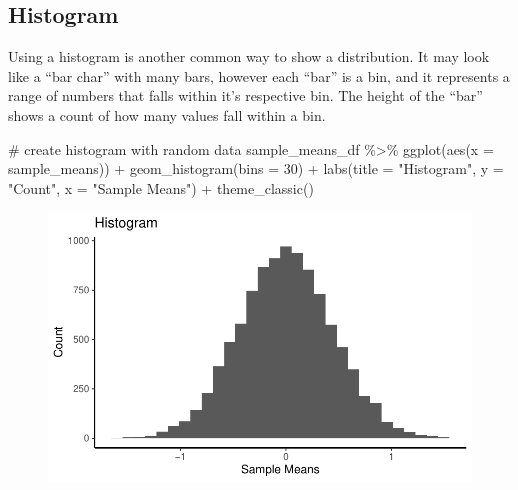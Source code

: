 \documentclass[
  letterpaper,
  DIV=11,
  numbers=noendperiod]{scrreprt}
\newenvironment{Shaded}{\begin{snugshade}}{\end{snugshade}}
\newcommand{\AttributeTok}[1]{\textcolor[rgb]{0.40,0.45,0.13}{#1}}
\newcommand{\CommentTok}[1]{\textcolor[rgb]{0.37,0.37,0.37}{#1}}
\newcommand{\DecValTok}[1]{\textcolor[rgb]{0.68,0.00,0.00}{#1}}
\newcommand{\FunctionTok}[1]{\textcolor[rgb]{0.28,0.35,0.67}{#1}}
\newcommand{\NormalTok}[1]{\textcolor[rgb]{0.00,0.23,0.31}{#1}}
\newcommand{\SpecialCharTok}[1]{\textcolor[rgb]{0.37,0.37,0.37}{#1}}
\newcommand{\StringTok}[1]{\textcolor[rgb]{0.13,0.47,0.30}{#1}}
\begin{document}
\hypertarget{histogram}{%
\subsection{Histogram}\label{histogram}}

Using a histogram is another common way to show a distribution. It may
look like a ``bar char'' with many bars, however each ``bar'' is a bin,
and it represents a range of numbers that falls within it's respective
bin. The height of the ``bar'' shows a count of how many values fall
within a bin.

\begin{Shaded}
\begin{Highlighting}[]
\CommentTok{\# create histogram with random data }
\NormalTok{sample\_means\_df }\SpecialCharTok{\%\textgreater{}\%}
  \FunctionTok{ggplot}\NormalTok{(}\FunctionTok{aes}\NormalTok{(}\AttributeTok{x =}\NormalTok{ sample\_means)) }\SpecialCharTok{+}
  \FunctionTok{geom\_histogram}\NormalTok{(}\AttributeTok{bins =} \DecValTok{30}\NormalTok{) }\SpecialCharTok{+}
  \FunctionTok{labs}\NormalTok{(}\AttributeTok{title =} \StringTok{"Histogram"}\NormalTok{, }\AttributeTok{y =} \StringTok{"Count"}\NormalTok{, }\AttributeTok{x =} \StringTok{"Sample Means"}\NormalTok{) }\SpecialCharTok{+}
  \FunctionTok{theme\_classic}\NormalTok{()}
\end{Highlighting}
\end{Shaded}

\begin{figure}[H]

{\centering \includegraphics{./visualizing-data_files/figure-pdf/unnamed-chunk-4-1.pdf}

}

\end{figure}
\end{document}
